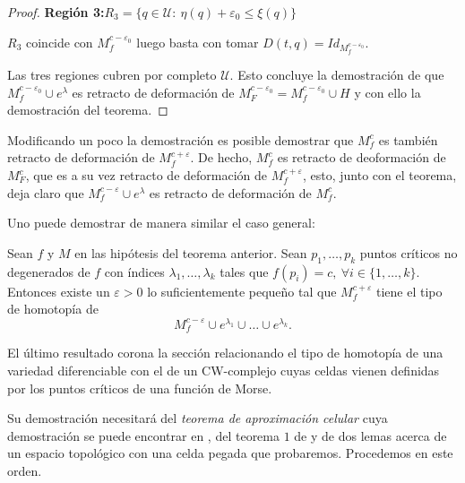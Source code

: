 \begin{proof}
    \textbf{Región 3:}\quad $R_3=\{q\in \mathcal{U}:~ \eta(q) + \varepsilon_0 \le \xi(q)\}$
    \bigskip

    $R_3$ coincide con $M_f^{c-\varepsilon_0}$ luego basta con tomar $D(t,q)= Id_{M_f^{c-\varepsilon_0}}$.
    \bigskip

    Las tres regiones cubren por completo $\mathcal{U}$. Esto concluye la demostración de que $M^{c-\varepsilon_0}_f\cup e^{\lambda}$ es retracto de deformación de $M^{c-\varepsilon_0}_F = M_f^{c-\varepsilon_0}\cup H$ y con ello la demostración del teorema.
    
\end{proof}
\begin{remark}
\label{obs_incluso_con_c_critico}
    Modificando un poco la demostración es posible demostrar que $M^c_f$ es también retracto de deformación de $M^{c+\varepsilon}_f$. De hecho, $M^c_f$ es retracto de deoformación de $M_F^c$, que es a su vez retracto de deformación de $M^{c+\varepsilon}_f$, esto, junto con el teorema, deja claro que $M^{c-\varepsilon}_f\cup e^{\lambda}$ es retracto de deformación de $M^c_f$.
\end{remark}

\bigskip

Uno puede demostrar de manera similar el caso general:

\begin{theorem}
\label{pegadocelula_general}
    Sean $f$ y $M$ en las hipótesis del teorema anterior. Sean $p_1,\dots, p_k$ puntos críticos no degenerados de $f$ con índices $\lambda_1,\dots, \lambda_k$ tales que $f(p_i)=c, ~\forall i\in \{1,\dots, k\}$. Entonces existe un $\varepsilon>0$ lo suficientemente pequeño tal que $M_f^{c+\varepsilon}$  tiene el tipo de homotopía de 
    \begin{equation*}
        M_f^{c-\varepsilon}\cup e^{\lambda_1}\cup\dots\cup e^{\lambda_k}.
    \end{equation*}
\end{theorem}
\bigskip


El último resultado corona la sección relacionando el tipo de homotopía de una variedad diferenciable con el de un CW-complejo cuyas celdas vienen definidas por los puntos críticos de una función de Morse. 

Su demostración necesitará del \textit{teorema de aproximación celular} cuya demostración se puede encontrar en \cite[p.~349]{hatcher2002}, del teorema $1$ de \cite{Whitehead1949CombinatorialHomotopy} y de dos lemas acerca de un espacio topológico con una celda pegada que probaremos. Procedemos en este orden.
\vspace{0.5em}


